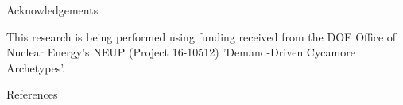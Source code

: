 \documentclass[final]{beamer}
\newlength{\onecolwid}
\newlength{\threecolwid}
\begin{document}
\begin{frame}[t]
\begin{columns}[t,totalwidth=\threecolwid]
\begin{column}{\onecolwid}

\begin{block}{Acknowledgements}
	
	This research is being performed using funding received from the DOE Office
	of Nuclear Energy's NEUP
	(Project 16-10512) 'Demand-Driven Cycamore Archetypes'.
	
	
\end{block}





\begin{block}{References}

	{\footnotesize 
	}
\end{block}





\end{column} %

\end{columns} %

\end{frame} %
\end{document}
